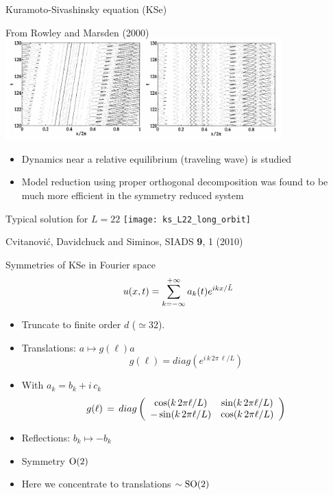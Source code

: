 \begin{frame}{Kuramoto-Sivashinsky equation (KSe)}
  \begin{block}{From Rowley and Marsden (2000)}
  \centering
    \includegraphics[width=0.8\textwidth]{rowley}
  \end{block}
  \begin{itemize}
   \item Dynamics near a relative equilibrium (traveling wave) is studied
   \item Model reduction using proper orthogonal decomposition was found to be much more efficient
   in the symmetry reduced system
  \end{itemize}

\end{frame}



\begin{frame}{Typical solution for $L=22$}
  \centering
  \texttt{[image: ks\_L22\_long\_orbit]}
  \begin{block}{}
    {\footnotesize Cvitanovi\'c, Davidchuck and Siminos, SIADS {\bf 9}, 1 (2010)}
  \end{block}
\end{frame}


\begin{frame}{Symmetries of KSe in Fourier space}
\[
    u(x,t)=\sum_{k=-\infty}^{+\infty} a_k (t) e^{ i k x /\tildeL }
\]
\begin{itemize}
  \item Truncate to finite order $d$ ($\simeq32$).
  \item Translations: $a\mapsto g(\ell)a$
    \[
       g(\ell)= diag(e^{i\,k\,2\pi\,\ell/L})
    \]  
  \item With $a_k=b_k+i\,c_k$
  \[
  \LieEl(\ell) \,=\,  diag\left(\barr{cc}
   \cos (k\, 2\pi\ell/L)  & \sin (k\, 2\pi\ell/L)   \\
   -\sin (k\, 2\pi\ell/L)  & \cos (k\, 2\pi\ell/L)  
      \earr\right)
  \] %
  \item Reflections: $b_k\mapsto -b_k$
  \item Symmetry $\On{2}$
  \item Here we concentrate to translations $\sim\SOn{2}$
\end{itemize}
\end{frame}


